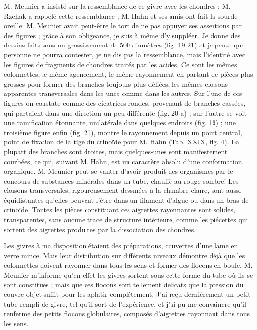 \documentclass[a4paper, 12pt, oneside, french]{book}
\begin{document}
M. Meunier a insisté sur la ressemblance de ce givre avec les chondres ; M. Rzehak a rappelé cette ressemblance ; M. Hahn et ses amis ont fait la sourde oreille. M. Meunier avait peut-être le tort de ne pas appuyer ses assertions par des figures ; grâce à son obligeance, je suis à même d'y suppléer. Je donne des dessins faits sous un grossissement de 500 diamètres (fig. 19-21) et je pense que personne ne pourra contester, je ne dis pas la ressemblance, mais l'identité avec les figures de fragments de chondres traités par les acides. Ce sont les mêmes colonnettes, le même agencement, le même rayonnement en partant de pièces plus grosses pour former des branches toujours plus déliées, les mêmes cloisons apparentes transversales dans les unes comme dans les autres. Sur l'une de ces figures on constate comme des cicatrices rondes, provenant de branches cassées, qui partaient dans une direction un peu différente (fig. 20 a) ; sur l'autre se voit une ramification étonnante, unilatérale dans quelques endroits (fig. 19) ; une troisième figure enfin (fig. 21), montre le rayonnement depuis un point central, point de fixation de la tige du crinoïde pour M. Hahn (Tab. XXIX, fig. 4). La plupart des branches sont droites, mais quelques-unes sont manifestement courbées, ce qui, suivant M. Hahn, est un caractère absolu d'une conformation organique. M. Meunier peut se vanter d'avoir produit des organismes par le concours de substances minérales dans un tube, chauffé au rouge sombre! Les cloisons transversales, rigoureusement dessinées à la chambre claire, sont aussi équidistantes qu'elles peuvent l'être dans un filament d'algue ou dans un bras de crinoïde. Toutes les pièces constituant ces aigrettes rayonnantes sont solides, transparentes, sans aucune trace de structure intérieure, comme les piécettes qui sortent des aigrettes produites par la dissociation des chondres.

Les givres à ma disposition étaient des préparations, couvertes d'une lame en verre mince. Mais leur distribution sur différents niveaux démontre déjà que les colonnettes doivent rayonner dans tous les sens et former des flocons en boule. M. Meunier m'informe qu'en effet les givres sortent sous cette forme du tube où ils se sont constitués ; mais que ces flocons sont tellement délicats que la pression du couvre-objet suffit pour les aplatir complétement. J'ai reçu dernièrement un petit tube rempli de givre, tel qu'il sort de l'expérience, et j'ai pu me convaincre qu'il renferme des petits flocons globulaires, composés d'aigrettes rayonnant dans tous les sens.
\end{document}
